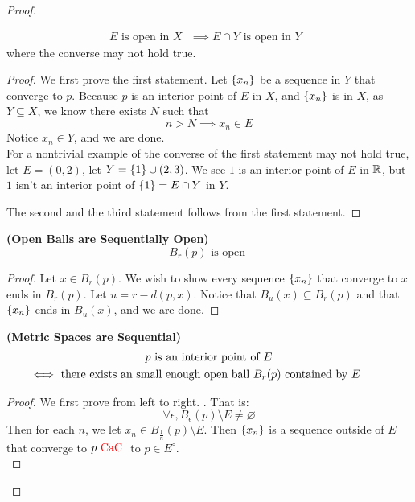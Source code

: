\documentclass{report}
\begin{document}
\begin{proof}
\begin{theorem}
\begin{gather}
E\text{ is open in $X$ }\implies E\cap Y\text{ is open in $Y$ }
\end{gather}
where the converse may not hold true.
\end{theorem}
\begin{proof}
We first prove the first statement. Let $\{ x_n \}$ be a sequence in $Y$ that converge to $p$. Because  $p$ is an interior point of  $E$ in  $X$, and  $\{ x_n \}$ is in $X$, as  $Y\subseteq X$, we know there exists $N$ such that 
 \begin{equation}
n>N\implies x_n\in E
\end{equation}
Notice $x_n\in Y$, and we are done.\\

For a nontrivial example of the converse of the first statement may not hold true, let $E=(0,2)$, let $Y=\{ 1 \}\cup (2,3)$. We see $1$ is an interior point of  $E$ in  $\mathbb{R}$, but  $1$ isn't an interior point of  $\{ 1 \}=E\cap Y$ in $Y$.

The second and the third statement follows from the first statement. 
\end{proof}
\begin{theorem}
\label{3.3.9}
  \textbf{(Open Balls are Sequentially Open)} 
  \begin{equation}
  B_r(p)\text{ is open }
  \end{equation}
\end{theorem}
\begin{proof}
Let $x\in B_r(p)$. We wish to show every sequence $\{ x_n \}$ that converge to $x$ ends in  $B_r(p)$. Let $u=r-d(p,x)$. Notice that $B_u(x)\subseteq B_r(p)$ and that $\{ x_n \}$ ends in $B_u(x)$, and we are done.
\end{proof}
\begin{theorem}
\label{3.3.10}
\textbf{(Metric Spaces are Sequential)} 
\begin{gather}
\text{ $p$ is an interior point of $E$ }\\
\liff \text{ there exists an small enough open ball $B_r(p)$ contained by $E$}
\end{gather}
\end{theorem}
\begin{proof}
We first prove from left to right. . That is:
\begin{equation}
\forall \epsilon, B_\epsilon (p)\setminus E\neq \varnothing
\end{equation}
Then for each $n$, we let  $x_n\in B_{\frac{1}{n}}(p)\setminus E$. Then $\{ x_n \}$ is a sequence outside of $E$ that converge to  $p\text{ \textcolor{red}{CaC} }$ to $p\in E^\circ $.\\


\end{proof}
\end{proof}
\end{document}
